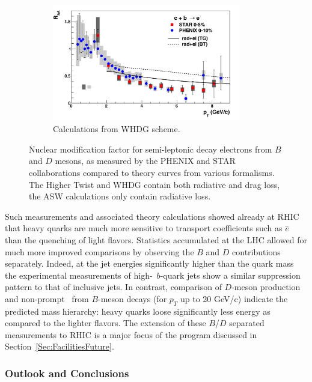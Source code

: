 \begin{figure}[!htp]
  \begin{subfigure}[b]{0.7\textwidth}
        \includegraphics[width=0.90\textwidth]{fig/raa-nonphot-whdg}
       \caption{Calculations from WHDG scheme\cite{Wicks:2005gt}.}
       \label{Fig:hqWHDG}
    \end{subfigure}    
    
    \caption[Nuclear modification factor for semi-leptonic decay electrons from $B$ and $D$ mesons]{Nuclear modification factor for semi-leptonic decay electrons from $B$ and $D$ mesons, 
    as measured by the PHENIX\cite{Adare:2006nq} and STAR\cite{Abelev:2006db} collaborations compared to theory curves from various formalisms. The Higher Twist and WHDG contain both radiative and drag loss, the ASW calculations only contain radiative loss.}
\label{Fig:non-photonic-suppression}    
\end{figure}

Such measurements and associated theory calculations showed already at RHIC that heavy quarks are much more sensitive to transport coefficients such as $\hat{e}$ than the quenching of light flavors.
Statistics accumulated at the LHC allowed for much more improved comparisons by observing the $B$ and $D$ contributions separately. Indeed, at the jet energies significantly higher than the quark mass the experimental measurements of high-\pT\  $b$-quark jets show a similar suppression pattern to that of inclusive jets. In contrast, comparison of $D$-meson production and non-prompt \JPsi\ from $B$-meson decays (for $p_{T}$ up to 20 GeV/c) indicate the predicted mass hierarchy: heavy quarks loose significantly less energy as compared to the lighter flavors. The extension of these $B$/$D$ separated measurements to RHIC is a major focus of the program discussed in Section~\ref{Sec:FacilitiesFuture}.
  
\subsubsection{Outlook and Conclusions}

